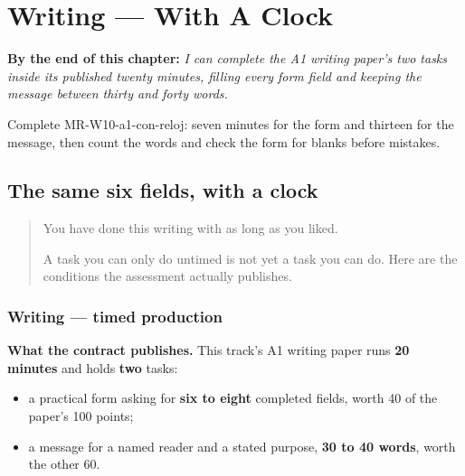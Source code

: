 
\chapter{Writing --- With A Clock}
\label{ch:mr-ghadyalasah}

\begin{chapteropening}
\textbf{By the end of this chapter:} \emph{I can complete the A1 writing paper's two tasks inside its published twenty minutes, filling every form field and keeping the message between thirty and forty words.}

Complete MR-W10-a1-con-reloj: seven minutes for the form and thirteen for the message, then count the words and check the form for blanks before mistakes.
\end{chapteropening}

\section[(timed)]{The same six fields, with a clock}

\label{lesson:MR-W10-a1-con-reloj}



\begin{quote}
You have done this writing with as long as you liked.

A task you can only do untimed is not yet a task you can do. Here are the conditions the assessment actually publishes.
\end{quote}

\subsection*{Writing — timed production}
\textbf{What the contract publishes.} This track's A1 writing paper runs \textbf{20 minutes} and holds \textbf{two} tasks:

\begin{itemize}
\raggedright
  \item a practical form asking for \textbf{six to eight} completed fields, worth 40 of the paper's 100 points;
  \item a message for a named reader and a stated purpose, \textbf{30 to 40 words}, worth the other 60.
\end{itemize}

